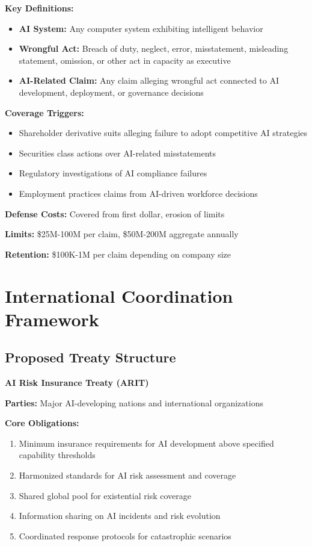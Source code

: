 \documentclass[11pt]{article}
\begin{document}
\textbf{Key Definitions:}
\begin{itemize}
   \item \textbf{AI System:} Any computer system exhibiting intelligent behavior
   \item \textbf{Wrongful Act:} Breach of duty, neglect, error, misstatement, misleading statement, omission, or other act in capacity as executive
   \item \textbf{AI-Related Claim:} Any claim alleging wrongful act connected to AI development, deployment, or governance decisions
\end{itemize}

\textbf{Coverage Triggers:}
\begin{itemize}
   \item Shareholder derivative suits alleging failure to adopt competitive AI strategies
   \item Securities class actions over AI-related misstatements
   \item Regulatory investigations of AI compliance failures
   \item Employment practices claims from AI-driven workforce decisions
\end{itemize}

\textbf{Defense Costs:} Covered from first dollar, erosion of limits

\textbf{Limits:} \$25M-100M per claim, \$50M-200M aggregate annually

\textbf{Retention:} \$100K-1M per claim depending on company size

\section{International Coordination Framework}

\subsection{Proposed Treaty Structure}

\textbf{AI Risk Insurance Treaty (ARIT)}

\textbf{Parties:} Major AI-developing nations and international organizations

\textbf{Core Obligations:}
\begin{enumerate}
   \item Minimum insurance requirements for AI development above specified capability thresholds
   \item Harmonized standards for AI risk assessment and coverage
   \item Shared global pool for existential risk coverage
   \item Information sharing on AI incidents and risk evolution
   \item Coordinated response protocols for catastrophic scenarios
\end{enumerate}
\end{document}
